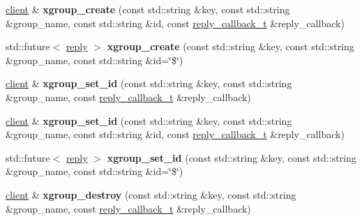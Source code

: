 \begin{DoxyCompactItemize}
\item 
\mbox{\label{classcpp__redis_1_1client_a7bcf21d1ddbe24ff42e0ee0135a665f9}} 
\mbox{\hyperlink{classcpp__redis_1_1client}{client}} \& {\bfseries xgroup\+\_\+create} (const std\+::string \&key, const std\+::string \&group\+\_\+name, const std\+::string \&id, const \mbox{\hyperlink{classcpp__redis_1_1client_af7a65eb21aa25230bfbb0b0203c4fc04}{reply\+\_\+callback\+\_\+t}} \&reply\+\_\+callback)
\item 
\mbox{\label{classcpp__redis_1_1client_ab275f61a685ecd5773aae3dea7865b05}} 
std\+::future$<$ \mbox{\hyperlink{classcpp__redis_1_1reply}{reply}} $>$ {\bfseries xgroup\+\_\+create} (const std\+::string \&key, const std\+::string \&group\+\_\+name, const std\+::string \&id=\char`\"{}\$\char`\"{})
\item 
\mbox{\label{classcpp__redis_1_1client_a537cac904fb4aa34c1b25d5c9cc86cc4}} 
\mbox{\hyperlink{classcpp__redis_1_1client}{client}} \& {\bfseries xgroup\+\_\+set\+\_\+id} (const std\+::string \&key, const std\+::string \&group\+\_\+name, const \mbox{\hyperlink{classcpp__redis_1_1client_af7a65eb21aa25230bfbb0b0203c4fc04}{reply\+\_\+callback\+\_\+t}} \&reply\+\_\+callback)
\item 
\mbox{\label{classcpp__redis_1_1client_a1bf822feb7c09dfb13a87e91ff68b1f9}} 
\mbox{\hyperlink{classcpp__redis_1_1client}{client}} \& {\bfseries xgroup\+\_\+set\+\_\+id} (const std\+::string \&key, const std\+::string \&group\+\_\+name, const std\+::string \&id, const \mbox{\hyperlink{classcpp__redis_1_1client_af7a65eb21aa25230bfbb0b0203c4fc04}{reply\+\_\+callback\+\_\+t}} \&reply\+\_\+callback)
\item 
\mbox{\label{classcpp__redis_1_1client_a4430aaf61ec70ddf2e5c16548452b159}} 
std\+::future$<$ \mbox{\hyperlink{classcpp__redis_1_1reply}{reply}} $>$ {\bfseries xgroup\+\_\+set\+\_\+id} (const std\+::string \&key, const std\+::string \&group\+\_\+name, const std\+::string \&id=\char`\"{}\$\char`\"{})
\item 
\mbox{\label{classcpp__redis_1_1client_a216e15a21d087ee51c1bfab7720ddcaa}} 
\mbox{\hyperlink{classcpp__redis_1_1client}{client}} \& {\bfseries xgroup\+\_\+destroy} (const std\+::string \&key, const std\+::string \&group\+\_\+name, const \mbox{\hyperlink{classcpp__redis_1_1client_af7a65eb21aa25230bfbb0b0203c4fc04}{reply\+\_\+callback\+\_\+t}} \&reply\+\_\+callback)

\end{DoxyCompactItemize}
